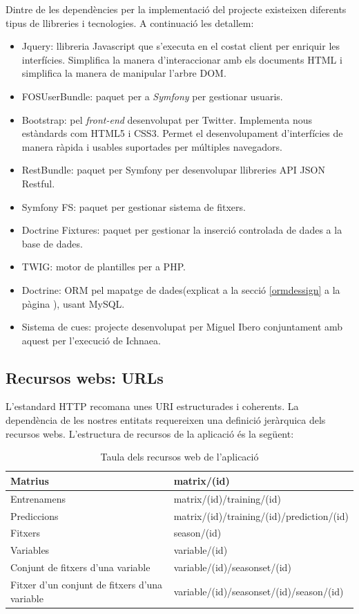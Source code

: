 Dintre de les dependències per la implementació del projecte existeixen diferents tipus de llibreries i tecnologies. A continuació les detallem:
\begin{itemize}
\item Jquery: llibreria Javascript que s'executa en el costat client per enriquir les interfícies.\cite{jquery} Simplifica la manera d'interaccionar amb els documents HTML\cite{html} i simplifica la manera de manipular l'arbre DOM.\cite{dom}
\item FOSUserBundle: paquet per a \textit{Symfony} per gestionar usuaris.\cite{fosuserbundle}
\item Bootstrap:  pel \textit{front-end} desenvolupat per Twitter. Implementa nous estàndards com HTML5\cite{html5} i CSS3\cite{css3}. Permet el desenvolupament d'interf\'{i}cies de manera r\`{a}pida i usables suportades per múltiples navegadors.
\item RestBundle: paquet per Symfony per desenvolupar llibreries API JSON Restful.\cite{apijson}
\item Symfony FS: paquet per gestionar sistema de fitxers.
\item Doctrine Fixtures: paquet per gestionar la inserci\'{o} controlada de dades a la base de dades.
\item TWIG: motor de plantilles per a PHP.\cite{twig}
\item Doctrine: ORM pel mapatge de dades(explicat a la secció \ref{ormdessign} a la p\`{a}gina \pageref{ormdessign}), usant MySQL.\cite{mysql}
\item Sistema de cues: projecte desenvolupat per Miguel Ibero conjuntament amb aquest per l'execució de Ichnaea.
\end{itemize}

\subsection{Recursos webs: URLs}
L'estandard HTTP recomana unes URI estructurades i coherents.\cite{rfc3986} La dependència de les nostres entitats requereixen una definició jeràrquica dels recursos webs. L'estructura de recursos de la aplicaci\'{o} \'{e}s la següent:\\

\begin{table}[ht]
\begin{tabular}{| p{5cm} | p{10cm} |}
\hline
Matrius     & matrix/(id) \\ \hline
Entrenamens & matrix/(id)/training/(id) \\ \hline
Prediccions & matrix/(id)/training/(id)/prediction/(id) \\ \hline
Fitxers 	& season/(id) \\ \hline
Variables	& variable/(id) \\ \hline
Conjunt de fitxers d'una variable & variable/(id)/seasonset/(id) \\ \hline
Fitxer d'un conjunt de fitxers d'una variable & variable/(id)/seasonset/(id)/season/(id) \\ \hline
\end{tabular}
\caption{Taula dels recursos web de l'aplicació}
\end{table}
\\

